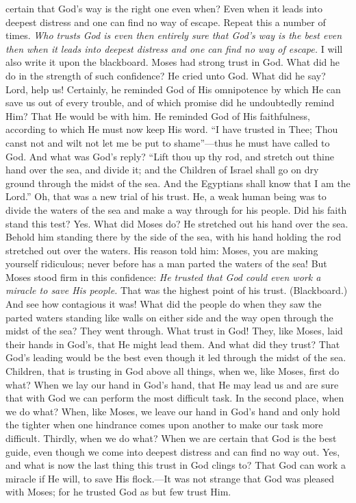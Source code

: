 certain that God’s way is the right one even when? Even when it leads into deepest distress and one can find no way of escape. Repeat this a number of times. \emph{Who trusts God is even then entirely sure that God’s way is the best even then when it leads into deepest distress and one can find no way of escape.} I will also write it upon the blackboard. Moses had strong trust in God. What did he do in the strength of such confidence? He cried unto God. What did he say? Lord, help us! Certainly, he reminded God of His omnipotence by which He can save us out of every trouble, and of which promise did he undoubtedly remind Him? That He would be with him. He reminded God of His faithfulness, according to which He must now keep His word. “I have trusted in Thee; Thou canst not and wilt not let me be put to shame”—thus he must have called to God. And what was God’s reply? “Lift thou up thy rod, and stretch out thine hand over the sea, and divide it; and the Children of Israel shall go on dry ground through the midst of the sea. And the Egyptians shall know that I am the Lord.” Oh, that was a new trial of his trust. He, a weak human being was to divide the waters of the sea and make a way through for his people. Did his faith stand this test? Yes. What did Moses do? He stretched out his hand over the sea. Behold him standing there by the side of the sea, with his hand holding the rod stretched out over the waters. His reason told him: Moses, you are making yourself ridiculous; never before has a man parted the waters of the sea! But Moses stood firm in this confidence: \emph{He trusted that God could even work a miracle to save His people.} That was the highest point of his trust. (Blackboard.) And see how contagious it was! What did the people do when they saw the parted waters standing like walls on either side and the way open through the midst of the sea? They went through. What trust in God! They, like Moses, laid their hands in God’s, that He might lead them. And what did they trust? That God’s leading would be the best even though it led through the midst of the sea. Children, that is trusting in God above all things, when we, like Moses, first do what? When we lay our hand in God’s hand, that He may lead us and are sure that with God we can perform the most difficult task. In the second place, when we do what? When, like Moses, we leave our hand in God’s hand and only hold the tighter when one hindrance comes upon another to make our task more difficult. Thirdly, when we do what? When we are certain that
God is the best guide, even though we come into deepest distress and can find no way out. Yes, and what is now the last thing this trust in God clings to? That God can work a miracle if He will, to save His flock.—It was not strange that God was pleased with Moses; for he trusted God as but few trust Him.

